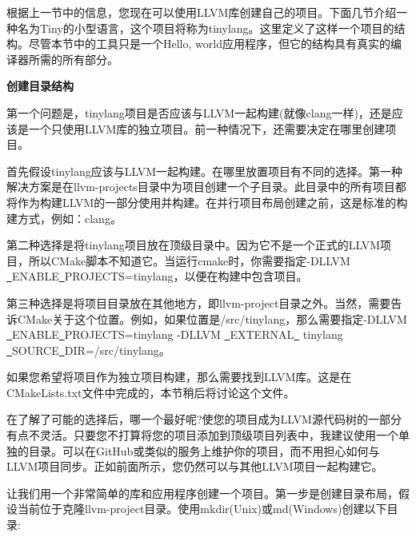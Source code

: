 根据上一节中的信息，您现在可以使用LLVM库创建自己的项目。下面几节介绍一种名为Tiny的小型语言，这个项目将称为tinylang。这里定义了这样一个项目的结构。尽管本节中的工具只是一个Hello, world应用程序，但它的结构具有真实的编译器所需的所有部分。\par

\hspace*{\fill} \par %
\textbf{创建目录结构}

第一个问题是，tinylang项目是否应该与LLVM一起构建(就像clang一样)，还是应该是一个只使用LLVM库的独立项目。前一种情况下，还需要决定在哪里创建项目。\par

首先假设tinylang应该与LLVM一起构建。在哪里放置项目有不同的选择。第一种解决方案是在llvm-projects目录中为项目创建一个子目录。此目录中的所有项目都将作为构建LLVM的一部分使用并构建。在并行项目布局创建之前，这是标准的构建方式，例如：clang。\par

第二种选择是将tinylang项目放在顶级目录中。因为它不是一个正式的LLVM项目，所以CMake脚本不知道它。当运行cmake时，你需要指定-DLLVM \underline{~}ENABLE\underline{~}PROJECTS=tinylang，以便在构建中包含项目。\par

第三种选择是将项目目录放在其他地方，即llvm-project目录之外。当然，需要告诉CMake关于这个位置。例如，如果位置是/src/tinylang，那么需要指定-DLLVM \underline{~}ENABLE\underline{~}PROJECTS=tinylang -DLLVM \underline{~}EXTERNAL\underline{~} tinylang \underline{~}SOURCE\underline{~}DIR=/src/tinylang。\par

如果您希望将项目作为独立项目构建，那么需要找到LLVM库。这是在CMakeLists.txt文件中完成的，本节稍后将讨论这个文件。\par

在了解了可能的选择后，哪一个最好呢?使您的项目成为LLVM源代码树的一部分有点不灵活。只要您不打算将您的项目添加到顶级项目列表中，我建议使用一个单独的目录。可以在GitHub或类似的服务上维护你的项目，而不用担心如何与LLVM项目同步。正如前面所示，您仍然可以与其他LLVM项目一起构建它。\par

让我们用一个非常简单的库和应用程序创建一个项目。第一步是创建目录布局，假设当前位于克隆llvm-project目录。使用mkdir(Unix)或md(Windows)创建以下目录:\par

